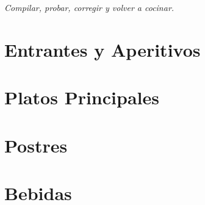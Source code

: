 \documentclass[11pt,a4paper,openany]{report}
\newcommand{\recetaPaginaCompleta}[1]{%
    \clearpage
}
\newcommand{\recetaBorrador}[1]{}
\begin{document}
\vfill
\begin{center}
    \large\itshape Compilar, probar, corregir y volver a cocinar.
\end{center}
\clearpage

\tableofcontents 
\newpage

\chapter{Entrantes y Aperitivos}
\recetaPaginaCompleta{secciones/entrantes/aceitunas_ajedrea.tex}
\recetaBorrador{secciones/entrantes/berenjenas_miel.tex}
\recetaPaginaCompleta{secciones/entrantes/boquerones_vinagre.tex}
\recetaPaginaCompleta{secciones/entrantes/guacamole.tex}
\recetaPaginaCompleta{secciones/entrantes/patatas_pobre.tex}
\recetaPaginaCompleta{secciones/entrantes/salmorejo.tex}

\chapter{Platos Principales}
\recetaPaginaCompleta{secciones/principales/arroz_lena.tex}
\recetaBorrador{secciones/principales/arroz_pulpo.tex}
\recetaPaginaCompleta{secciones/principales/asado_versatil.tex}
\recetaBorrador{secciones/principales/empedrao.tex}
\recetaPaginaCompleta{secciones/principales/fajitas.tex}
\recetaPaginaCompleta{secciones/principales/fideos.tex}
\recetaPaginaCompleta{secciones/principales/sopa_miso.tex}
\recetaBorrador{secciones/principales/fritailla.tex}
\recetaPaginaCompleta{secciones/principales/guisillo.tex}
\recetaBorrador{secciones/principales/gurullos_conejo.tex}
\recetaBorrador{secciones/principales/migas.tex}
\recetaBorrador{secciones/principales/pelotas_almerienses.tex}
\recetaPaginaCompleta{secciones/principales/caldo_pescado.tex}
\recetaPaginaCompleta{secciones/principales/remojon.tex}
\recetaPaginaCompleta{secciones/principales/tacos_entrana.tex}
\recetaPaginaCompleta{secciones/principales/tacos_al_pastor.tex}

\chapter{Postres}
\recetaPaginaCompleta{secciones/postres/cobbler_melocoton.tex}
\recetaPaginaCompleta{secciones/postres/mousse_limon.tex}

\chapter{Bebidas}
\recetaPaginaCompleta{secciones/bebidas/chocolate_taza.tex}
\recetaPaginaCompleta{secciones/bebidas/leche_canela_limon.tex}
\end{document}
